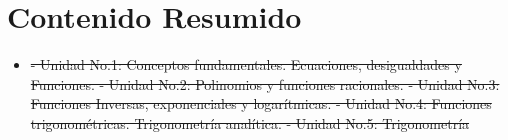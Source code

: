 \documentclass[11pt]{article}
\providecommand{\DIFaddtex}[1]{{\protect\color{blue}\uwave{#1}}} %
\providecommand{\DIFdeltex}[1]{{\protect\color{red}\sout{#1}}}                      %
\providecommand{\DIFaddbegin}{} %
\providecommand{\DIFaddend}{} %
\providecommand{\DIFdelbegin}{} %
\providecommand{\DIFdelend}{} %
\providecommand{\DIFadd}[1]{\texorpdfstring{\DIFaddtex{#1}}{#1}} %
\providecommand{\DIFdel}[1]{\texorpdfstring{\DIFdeltex{#1}}{}} %
\newcommand{\DIFscaledelfig}{0.5}
\newlength{\DIFdelgraphicswidth} %
\newlength{\DIFdelgraphicsheight} %
\newcommand{\DIFaddincludegraphics}[2][]{{\color{blue}\fbox{\DIFOincludegraphics[#1]{#2}}}} %
\newcommand{\DIFdelincludegraphics}[2][]{%
\sbox{\DIFdelgraphicsbox}{\DIFOincludegraphics[#1]{#2}}%
\settoboxwidth{\DIFdelgraphicswidth}{\DIFdelgraphicsbox} %
\settoboxtotalheight{\DIFdelgraphicsheight}{\DIFdelgraphicsbox} %
\scalebox{\DIFscaledelfig}{%
\parbox[b]{\DIFdelgraphicswidth}{\usebox{\DIFdelgraphicsbox}\\[-\baselineskip] \rule{\DIFdelgraphicswidth}{0em}}\llap{\resizebox{\DIFdelgraphicswidth}{\DIFdelgraphicsheight}{%
\setlength{\unitlength}{\DIFdelgraphicswidth}%
\begin{picture}(1,1)%
\thicklines\linethickness{2pt} %
{\color[rgb]{1,0,0}\put(0,0){\framebox(1,1){}}}%
{\color[rgb]{1,0,0}\put(0,0){\line( 1,1){1}}}%
{\color[rgb]{1,0,0}\put(0,1){\line(1,-1){1}}}%
\end{picture}%
}\hspace*{3pt}}} %
} %
\DeclareRobustCommand{\DIFaddbegin}{\DIFOaddbegin \let\includegraphics\DIFaddincludegraphics} %
\DeclareRobustCommand{\DIFaddend}{\DIFOaddend \let\includegraphics\DIFOincludegraphics} %
\DeclareRobustCommand{\DIFdelbegin}{\DIFOdelbegin \let\includegraphics\DIFdelincludegraphics} %
\DeclareRobustCommand{\DIFdelend}{\DIFOaddend \let\includegraphics\DIFOincludegraphics} %
\begin{document}
\section*{Contenido Resumido}

\begin{itemize}
\item \DIFdelbegin \DIFdel{- Unidad No.1: Conceptos fundamentales. Ecuaciones,  desigualdades y Funciones. - Unidad No.2: Polinomios y funciones racionales. - Unidad No.3: Funciones Inversas, exponenciales y logarítmicas. - Unidad No.4: Funciones trigonométricas. Trigonometría analítica. - Unidad No.5: Trigonometría 
}\DIFdelend \DIFaddbegin \DIFadd{item 1 
}\DIFaddend \end{itemize}

\end{document}
